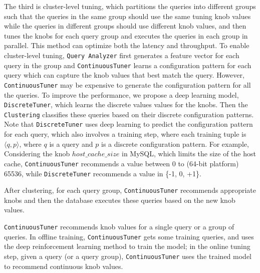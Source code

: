 \vspace{.25em}
 The third is cluster-level tuning, which partitions the queries into different groups such that the queries in the same group should use the same tuning knob values while the queries in different groups should use different knob values, and then tunes the knobs for each query group and executes the queries in each group in parallel. This method can optimize both the latency and throughput.  To enable cluster-level tuning, \texttt{Query Analyzer} first generates a feature vector for each query in the group and \texttt{ContinuousTuner} learns a configuration pattern for each query which can capture the knob values that best match the query. However, \texttt{ContinuousTuner} may be expensive to generate the configuration pattern for all the queries. To improve the performance, we propose a deep learning model, \texttt{DiscreteTuner}, which learns  the discrete values values for the knobs. Then the \texttt{Clustering} classifies these queries based on their discrete configuration patterns. Note that  \texttt{DiscreteTuner} uses deep learning to predict the configuration pattern for each query, which also involves a training step, where each training tuple is $\langle q, p\rangle$, where $q$ is a query and $p$ is a discrete configuration pattern. For example,  Considering the knob $host\_cache\_size$ in MySQL, which limits the size of the host cache, \texttt{ContinuousTuner} recommends a value between 0 to (64-bit platform) 65536, while \texttt{DiscreteTuner} recommends a value in \{-1, 0, +1\}.




After clustering, for each query group, \texttt{ContinuousTuner}  recommends appropriate knobs and then the database executes these queries based on the new knob values. 


 
 \texttt{ContinuousTuner} recommends knob values for a single query or a group of queries.  In offline training,  \texttt{ContinuousTuner} gets some training queries, and uses the deep reinforcement learning method to train the model; in the online tuning step, given a query (or a query group), \texttt{ContinuousTuner} uses the trained model to recommend continuous  knob values. 


